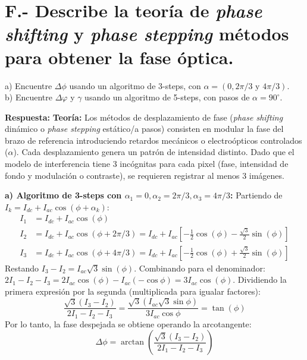 \documentclass[12pt,letterpaper]{article}
\begin{document}
	\newpage
	\section*{F.- Describe la teoría de \textit{phase shifting} y \textit{phase stepping} métodos para obtener la fase óptica.}
		a) Encuentre $\Delta\phi$ usando un algoritmo de 3-steps, con $\alpha=(0, 2\pi/3 \text{ y } 4\pi/3)$.\\
		b) Encuentre $\Delta\varphi$ y $\gamma$ usando un algoritmo de 5-steps, con pasos de $\alpha=90^\circ$.
	
	\textbf{Respuesta:}
	\textbf{Teoría:} Los métodos de desplazamiento de fase (\textit{phase shifting} dinámico o \textit{phase stepping} estático/a pasos) consisten en modular la fase del brazo de referencia introduciendo retardos mecánicos o electroópticos controlados ($\alpha$). Cada desplazamiento genera un patrón de intensidad distinto. Dado que el modelo de interferencia tiene 3 incógnitas para cada pixel (fase, intensidad de fondo y modulación o contraste), se requieren registrar al menos 3 imágenes.
	
	\textbf{a) Algoritmo de 3-steps con $\alpha_1=0, \alpha_2=2\pi/3, \alpha_3=4\pi/3$:}
	Partiendo de $I_k = I_{dc} + I_{ac}\cos(\phi + \alpha_k)$:
	\begin{align*}
		I_1 &= I_{dc} + I_{ac}\cos(\phi) \\
		I_2 &= I_{dc} + I_{ac}\cos(\phi + 2\pi/3) = I_{dc} + I_{ac}\left[-\frac{1}{2}\cos(\phi) - \frac{\sqrt{3}}{2}\sin(\phi)\right] \\
		I_3 &= I_{dc} + I_{ac}\cos(\phi + 4\pi/3) = I_{dc} + I_{ac}\left[-\frac{1}{2}\cos(\phi) + \frac{\sqrt{3}}{2}\sin(\phi)\right]
	\end{align*}
	Restando $I_3 - I_2 = I_{ac}\sqrt{3}\sin(\phi)$.
	Combinando para el denominador: $2I_1 - I_2 - I_3 = 2I_{ac}\cos(\phi) - I_{ac}(-\cos\phi) = 3I_{ac}\cos(\phi)$.
	Dividiendo la primera expresión por la segunda (multiplicada para igualar factores):
	\[
	\frac{\sqrt{3}(I_3 - I_2)}{2I_1 - I_2 - I_3} = \frac{\sqrt{3}(I_{ac}\sqrt{3}\sin\phi)}{3I_{ac}\cos\phi} = \tan(\phi)
	\]
	Por lo tanto, la fase despejada se obtiene operando la arcotangente:
	\[
	\Delta\phi = \arctan\left( \frac{\sqrt{3}(I_3 - I_2)}{2I_1 - I_2 - I_3} \right)
	\]
	
\end{document}
